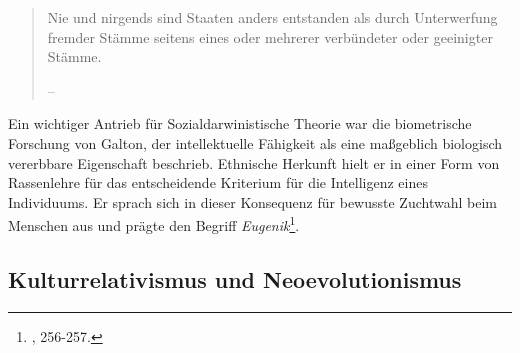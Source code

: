 \documentclass[openany,twoside,twocolumn]{book}
\let\rmarkdownfootnote\footnote%
\def\footnote{\protect\rmarkdownfootnote}
\begin{document}
\begin{quote}
Nie und nirgends sind Staaten anders entstanden als durch Unterwerfung
fremder Stämme seitens eines oder mehrerer verbündeter oder geeinigter
Stämme.

-- \autocite[99.]{GumplowiczGrundrissSoziologie1885}
\end{quote}

Ein wichtiger Antrieb für Sozialdarwinistische Theorie war die
biometrische Forschung von Galton, der intellektuelle Fähigkeit als eine
maßgeblich biologisch vererbbare Eigenschaft beschrieb. Ethnische
Herkunft hielt er in einer Form von Rassenlehre für das entscheidende
Kriterium für die Intelligenz eines Individuums. Er sprach sich in
dieser Konsequenz für bewusste Zuchtwahl beim Menschen aus und prägte
den Begriff \emph{Eugenik}\footnote{\textcite{bowler_evolution_1989},
  256-257.}.

\hypertarget{cultural-relativism-neoevolutionism}{%
\subsection{Kulturrelativismus und
Neoevolutionismus}\label{cultural-relativism-neoevolutionism}}
\end{document}
